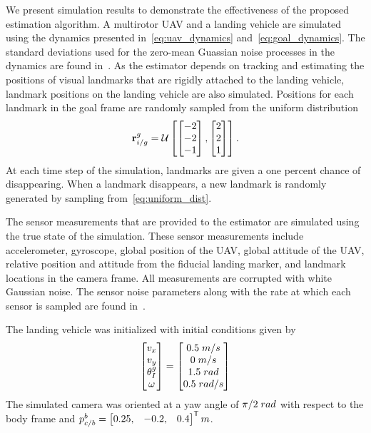 
We present simulation results to demonstrate the effectiveness of the proposed estimation
algorithm.
A multirotor UAV and a landing vehicle are simulated using the dynamics presented
in~\eqref{eq:uav_dynamics} and~\eqref{eq:goal_dynamics}.
The standard deviations used for the zero-mean
Guassian noise processes in the dynamics are found
in~.
As the estimator depends on
tracking and estimating the positions of visual landmarks that are rigidly
attached to the landing vehicle, landmark positions on the landing vehicle
are also simulated.
Positions for each landmark in the goal frame are
randomly sampled from the
uniform distribution
\begin{equation}
  \vect{r}_{i/g}^g = \mathcal{U}
  \left[ \begin{bmatrix} -2 \\ -2 \\ -1 \end{bmatrix},
  \begin{bmatrix} 2 \\ 2 \\ 1 \end{bmatrix} \right].
  \label{eq:uniform_dist}
\end{equation}
At each time step of the simulation, landmarks are given a one percent chance
of disappearing. When a landmark disappears, a new landmark is randomly
generated by sampling from~\eqref{eq:uniform_dist}.

The sensor measurements that are provided to the estimator are simulated using the true
state of the simulation. These sensor measurements include accelerometer,
gyroscope, global position of the UAV, global attitude 
of the UAV, relative position and attitude from the fiducial landing marker, and
landmark locations in the camera frame. All measurements are
corrupted with white Gaussian noise. The sensor noise parameters along with the
rate at which each sensor is sampled are found
in~.

The landing vehicle was initialized with initial conditions given by
\begin{equation}
  \begin{bmatrix}
    v_x \\
    v_y \\
    \theta_I^g \\
    \omega
  \end{bmatrix}
  =
  \begin{bmatrix}
    0.5 \hphantom{\cdot} m/s \\
    0 \hphantom{\cdot} m/s \\
    1.5 \hphantom{\cdot} rad \\
    0.5 \hphantom{\cdot} rad/s
  \end{bmatrix}
\end{equation}
The 
simulated camera was oriented at a yaw angle of $\pi/2 \hphantom{\cdot} rad$ with respect to the body
frame and $p_{c/b}^b = \begin{bmatrix}0.25, & -0.2, &
0.4 \end{bmatrix}^{\mathsf{T}} m$.

